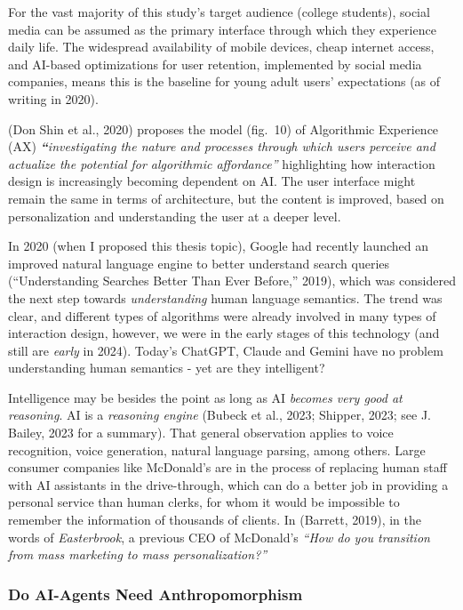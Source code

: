 \documentclass[
  letterpaper,
  DIV=11,
  numbers=noendperiod]{scrartcl}
\begin{document}
For the vast majority of this study's target audience (college
students), social media can be assumed as the primary interface through
which they experience daily life. The widespread availability of mobile
devices, cheap internet access, and AI-based optimizations for user
retention, implemented by social media companies, means this is the
baseline for young adult users' expectations (as of writing in 2020).

(Don Shin et al., 2020) proposes the model (fig.~10) of Algorithmic
Experience (AX) \emph{\textbf{``}investigating the nature and processes
through which users perceive and actualize the potential for algorithmic
affordance''} highlighting how interaction design is increasingly
becoming dependent on AI. The user interface might remain the same in
terms of architecture, but the content is improved, based on
personalization and understanding the user at a deeper level.

In 2020 (when I proposed this thesis topic), Google had recently
launched an improved natural language engine to better understand search
queries ({``Understanding Searches Better Than Ever Before,''} 2019),
which was considered the next step towards \emph{understanding} human
language semantics. The trend was clear, and different types of
algorithms were already involved in many types of interaction design,
however, we were in the early stages of this technology (and still are
\emph{early} in 2024). Today's ChatGPT, Claude and Gemini have no
problem understanding human semantics - yet are they intelligent?

Intelligence may be besides the point as long as AI \emph{becomes very
good at reasoning}. AI is a \emph{reasoning engine} (Bubeck et al.,
2023; Shipper, 2023; see J. Bailey, 2023 for a summary). That general
observation applies to voice recognition, voice generation, natural
language parsing, among others. Large consumer companies like McDonald's
are in the process of replacing human staff with AI assistants in the
drive-through, which can do a better job in providing a personal service
than human clerks, for whom it would be impossible to remember the
information of thousands of clients. In (Barrett, 2019), in the words of
\emph{Easterbrook}, a previous CEO of McDonald's \emph{``How do you
transition from mass marketing to mass personalization?''}

\subsubsection{Do AI-Agents Need
Anthropomorphism}\label{do-ai-agents-need-anthropomorphism}
\end{document}
